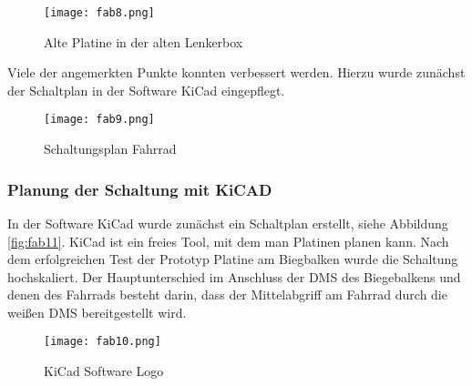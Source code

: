 \begin{figure}[h]
    \begin{center}
        \texttt{[image: fab8.png]}
        \caption[Alte Platine in der alten Lenkerbox (Abbildungsverzeichnis)]{Alte Platine in der alten Lenkerbox}
        
       \label{fig:fab8}
    \end{center}
\end{figure}

Viele der angemerkten Punkte konnten verbessert werden. Hierzu wurde zunächst der Schaltplan in der Software KiCad\cite{KiCadWebsite} eingepflegt.

\begin{figure}[h]
    \begin{center}
        \texttt{[image: fab9.png]}
        \caption[Schaltungsplan Fahrrad (Abbildungsverzeichnis)]{Schaltungsplan Fahrrad}
        
        \label{fig:fab9}
    \end{center}
\end{figure}

\subsubsection{Planung der Schaltung mit KiCAD}
In der Software KiCad\cite{KiCadWebsite} wurde zunächst ein Schaltplan erstellt, siehe Abbildung \ref{fig:fab11}.
KiCad ist ein freies Tool, mit dem man Platinen planen kann. Nach dem erfolgreichen Test der Prototyp Platine am Biegbalken wurde die Schaltung hochskaliert. Der Hauptunterschied im Anschluss der DMS des Biegebalkens und denen des Fahrrads besteht darin, dass der Mittelabgriff am Fahrrad durch die weißen DMS bereitgestellt wird.

\begin{figure}[htbp]
    \begin{center}
        \texttt{[image: fab10.png]}
        \caption[KiCad Software Logo (Abbildungsverzeichnis)]{KiCad Software Logo}
        \cite{KiCadWebsite}
        \label{fig:fab10}
    \end{center}
\end{figure}


